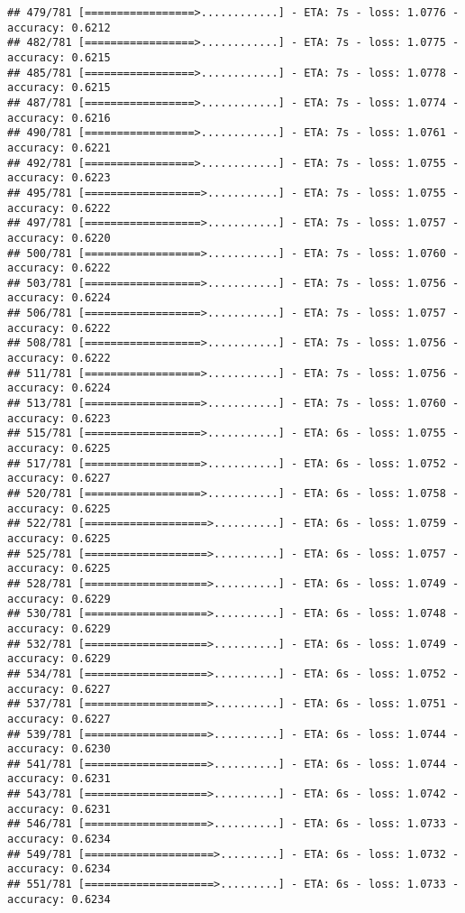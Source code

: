 \documentclass[
]{article}
\begin{document}
\begin{verbatim}
## 479/781 [=================>............] - ETA: 7s - loss: 1.0776 - accuracy: 0.6212
## 482/781 [=================>............] - ETA: 7s - loss: 1.0775 - accuracy: 0.6215
## 485/781 [=================>............] - ETA: 7s - loss: 1.0778 - accuracy: 0.6215
## 487/781 [=================>............] - ETA: 7s - loss: 1.0774 - accuracy: 0.6216
## 490/781 [=================>............] - ETA: 7s - loss: 1.0761 - accuracy: 0.6221
## 492/781 [=================>............] - ETA: 7s - loss: 1.0755 - accuracy: 0.6223
## 495/781 [==================>...........] - ETA: 7s - loss: 1.0755 - accuracy: 0.6222
## 497/781 [==================>...........] - ETA: 7s - loss: 1.0757 - accuracy: 0.6220
## 500/781 [==================>...........] - ETA: 7s - loss: 1.0760 - accuracy: 0.6222
## 503/781 [==================>...........] - ETA: 7s - loss: 1.0756 - accuracy: 0.6224
## 506/781 [==================>...........] - ETA: 7s - loss: 1.0757 - accuracy: 0.6222
## 508/781 [==================>...........] - ETA: 7s - loss: 1.0756 - accuracy: 0.6222
## 511/781 [==================>...........] - ETA: 7s - loss: 1.0756 - accuracy: 0.6224
## 513/781 [==================>...........] - ETA: 7s - loss: 1.0760 - accuracy: 0.6223
## 515/781 [==================>...........] - ETA: 6s - loss: 1.0755 - accuracy: 0.6225
## 517/781 [==================>...........] - ETA: 6s - loss: 1.0752 - accuracy: 0.6227
## 520/781 [==================>...........] - ETA: 6s - loss: 1.0758 - accuracy: 0.6225
## 522/781 [===================>..........] - ETA: 6s - loss: 1.0759 - accuracy: 0.6225
## 525/781 [===================>..........] - ETA: 6s - loss: 1.0757 - accuracy: 0.6225
## 528/781 [===================>..........] - ETA: 6s - loss: 1.0749 - accuracy: 0.6229
## 530/781 [===================>..........] - ETA: 6s - loss: 1.0748 - accuracy: 0.6229
## 532/781 [===================>..........] - ETA: 6s - loss: 1.0749 - accuracy: 0.6229
## 534/781 [===================>..........] - ETA: 6s - loss: 1.0752 - accuracy: 0.6227
## 537/781 [===================>..........] - ETA: 6s - loss: 1.0751 - accuracy: 0.6227
## 539/781 [===================>..........] - ETA: 6s - loss: 1.0744 - accuracy: 0.6230
## 541/781 [===================>..........] - ETA: 6s - loss: 1.0744 - accuracy: 0.6231
## 543/781 [===================>..........] - ETA: 6s - loss: 1.0742 - accuracy: 0.6231
## 546/781 [===================>..........] - ETA: 6s - loss: 1.0733 - accuracy: 0.6234
## 549/781 [====================>.........] - ETA: 6s - loss: 1.0732 - accuracy: 0.6234
## 551/781 [====================>.........] - ETA: 6s - loss: 1.0733 - accuracy: 0.6234

\end{verbatim}
\end{document}
